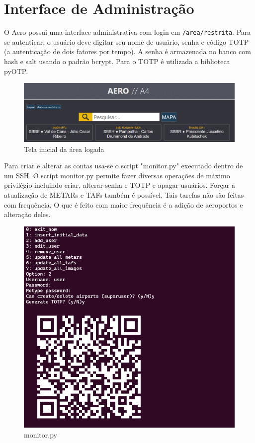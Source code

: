 \chapter{Interface de Administração}

O Aero possui uma interface administrativa com login em \verb|/area/restrita|. 
Para se autenticar,
o usuário deve digitar seu nome de usuário, senha e código TOTP (a autenticação
de dois fatores por tempo). A senha é armazenada no banco com hash e salt usando 
o padrão bcrypt. Para o TOTP é utilizada a biblioteca pyOTP. 

\begin{figure}[H]
    \begin{center}
    \includegraphics[width=\linewidth]{img/area-restrita-root.png}
    \caption{Tela inicial da área logada}
    \label{fig:max-priv-sys}
    \end{center}
\end{figure}

Para criar e alterar as contas usa-se o script "monitor.py" executado dentro
de um SSH.
O script monitor.py permite fazer diversas operações de máximo privilégio 
incluindo criar, alterar senha e TOTP e apagar usuários. Forçar a atualização de
METARs e TAFs também é possível. Tais tarefas não são 
feitas com frequência. O que é feito com maior frequência é a adição de aeroportos 
e alteração deles.

\begin{figure}[H]
    \begin{center}
    \includegraphics[width=0.8\linewidth]{img/create-user-script.png}
    \caption{monitor.py}
    \label{fig:max-priv-sys}
    \end{center}
\end{figure}

